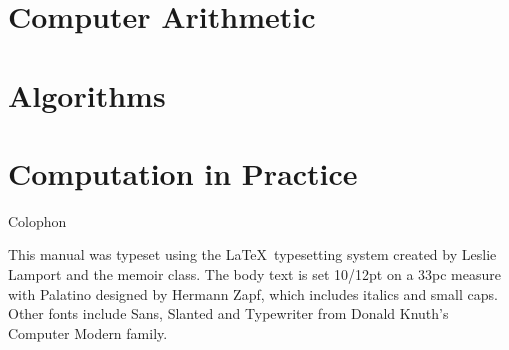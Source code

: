 \documentclass[letterpaper,10pt,extrafontsizesmtwoside,onecolumn,openright,fleqn]{memoir}
\begin{document}


\part{Computer Arithmetic}







\part{Algorithms}










\part{Computation in Practice}







\backmatter

\cleardoublepage
{}
{}
\printindex

\cleardoublepage
\pagestyle{empty}
\null\vfil

\begin{adjustwidth}{1in}{1in}
\begin{center}
{\Large\textsf{Colophon}}
\end{center}
\begin{center}
This manual was typeset using the \LaTeX\ typesetting system
created by Leslie Lamport and the memoir class.
The body text is set 10/12pt on a
33pc measure with Palatino designed by Hermann Zapf, which includes
italics and small caps. Other fonts include
Sans, Slanted and Typewriter from Donald Knuth's
Computer Modern family.

\end{center}

\end{adjustwidth}

\vfil
\end{document}
